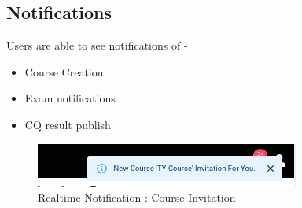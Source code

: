\documentclass[10pt]{article}
\begin{document}
\subsection{Notifications}

Users are able to see notifications of -

\begin{itemize}
  \item Course Creation
  \item Exam notifications
  \item CQ result publish
\end{itemize}

\begin{figure}[H]
  \centering
  \centerline{\includegraphics[width=\textwidth]{studnt/course-create-notification-realtime.png}}
  \caption{Realtime Notification :  Course Invitation}
  \label{fig}
\end{figure}
\end{document}
